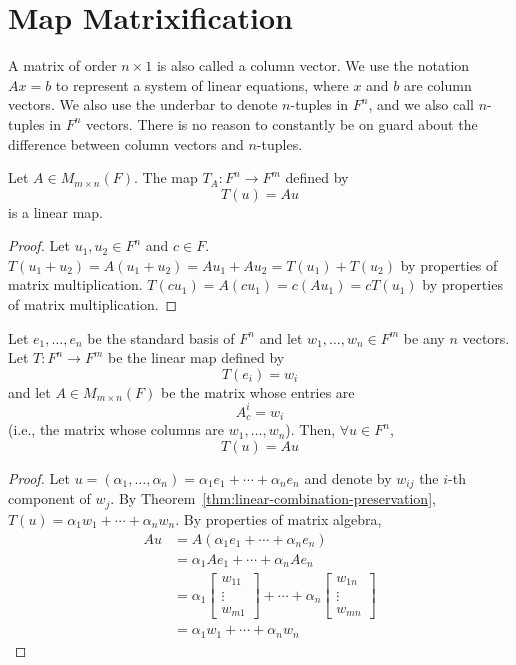  \section{Map Matrixification}

\begin{note} A matrix of order $n \times 1$ is also called a column vector. We
use the notation $Ax = b$ to represent a system of linear equations, where $x$
and $b$ are column vectors. We also use the underbar to denote $n$-tuples in
$F^n$, and we also call $n$-tuples in $F^n$ vectors. There is no reason to
constantly be on guard about the difference between column vectors and
$n$-tuples. \end{note}

\begin{theorem}\label{thm:matrix-defines-map} Let
$A \in M_{m \times n}(F)$. The map $T_A: F^n \to F^m$ defined by \[ T(u) = Au \]
is a linear map. \end{theorem}

\begin{proof} Let $u_1, u_2 \in F^n$ and $c \in F$. $T(u_1 + u_2) = A(u_1 +
u_2) = Au_1 + Au_2 = T(u_1) + T(u_2)$ by properties of matrix multiplication.
$T(cu_1) = A(cu_1) = c(Au_1) = cT(u_1)$ by properties of matrix multiplication.
\end{proof}

\begin{theorem}\label{thm:standard-basis-matrix} Let
$e_1, \ldots, e_n$ be the standard basis of $F^n$ and let $w_1, \ldots, w_n \in
F^m$ be any $n$ vectors. Let $T: F^n \to F^m$ be the linear map defined by \[
T(e_i) = w_i \] and let $A \in M_{m \times n}(F)$ be the matrix whose entries
are \[ A_c^i = w_i \] (i.e., the matrix whose columns are $w_1, \ldots, w_n$).
Then, $\forall u \in F^n$, \[ T(u) = Au \] \end{theorem}

\begin{proof} Let $u = (\alpha_1, \ldots, \alpha_n) = \alpha_1 e_1 + \cdots +
\alpha_n e_n$ and denote by $w_{ij}$ the $i$-th component of $w_j$. By
Theorem~\ref{thm:linear-combination-preservation}, $T(u) = \alpha_1 w_1 + \cdots
+ \alpha_n w_n$. By properties of matrix algebra, \begin{align*} Au &=
A(\alpha_1 e_1 + \cdots + \alpha_n e_n) \\ &= \alpha_1 Ae_1 + \cdots + \alpha_n
Ae_n \\ &= \alpha_1 \begin{bmatrix} w_{11} \\ \vdots \\ w_{m1} \end{bmatrix} +
\cdots + \alpha_n \begin{bmatrix} w_{1n} \\ \vdots \\ w_{mn} \end{bmatrix} \\ &=
\alpha_1 w_1 + \cdots + \alpha_n w_n \end{align*} \end{proof}

